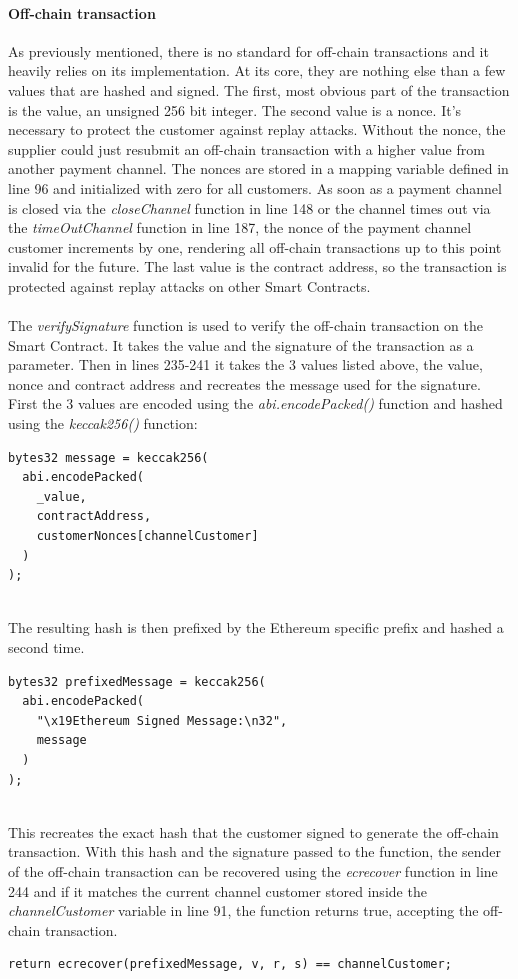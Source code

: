 \paragraph{Off-chain transaction}
As previously mentioned, there is no standard for off-chain transactions and it heavily relies on its implementation. At its core, they are nothing else than a few values that are hashed and signed. The first, most obvious part of the transaction is the value, an unsigned 256 bit integer. The second value is a nonce. It’s necessary to protect the customer against replay attacks. Without the nonce, the supplier could just resubmit an off-chain transaction with a higher value from another payment channel. The nonces are stored in a mapping variable defined in line 96 and initialized with zero for all customers. As soon as a payment channel is closed via the \textit{closeChannel} function in line 148 or the channel times out via the \textit{timeOutChannel} function in line 187, the nonce of the payment channel customer increments by one, rendering all off-chain transactions up to this point invalid for the future. The last value is the contract address, so the transaction is protected against replay attacks on other Smart Contracts.
\\\\
The \textit{verifySignature} function is used to verify the off-chain transaction on the Smart Contract. It takes the value and the signature of the transaction as a parameter. Then in lines 235-241 it takes the 3 values listed above, the value, nonce and contract address and recreates the message used for the signature. First the 3 values are encoded using the \textit{abi.encodePacked()} function and hashed using the \textit{keccak256()} function:
\\
\begin{lstlisting}[language=Solidity, numbers=none]
bytes32 message = keccak256(
  abi.encodePacked(
    _value,
    contractAddress,
    customerNonces[channelCustomer]
  )
);
\end{lstlisting}
\leavevmode
\\
The resulting hash is then prefixed by the Ethereum specific prefix and hashed a second time.
\\
\begin{lstlisting}[language=Solidity, numbers=none]
bytes32 prefixedMessage = keccak256(
  abi.encodePacked(
    "\x19Ethereum Signed Message:\n32",
    message
  )
);
\end{lstlisting}
\leavevmode
\\
This recreates the exact hash that the customer signed to generate the off-chain transaction. With this hash and the signature passed to the function, the sender of the off-chain transaction can be recovered using the \textit{ecrecover} function in line 244 and if it matches the current channel customer stored inside the \textit{channelCustomer} variable in line 91, the function returns true, accepting the off-chain transaction.
\\
\begin{lstlisting}[language=Solidity, numbers=none]
return ecrecover(prefixedMessage, v, r, s) == channelCustomer;
\end{lstlisting}
\leavevmode
\\
